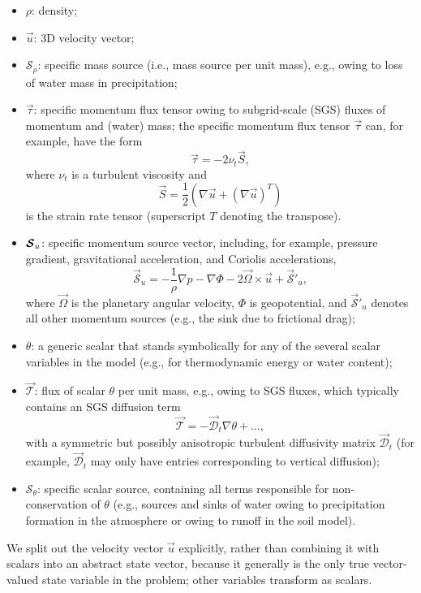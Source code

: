 \documentclass{report}
\begin{document}
\begin{itemize}
    \item $\rho$: density;
    \item $\vec{u}$: 3D velocity vector;
    \item $\mathcal{S}_\rho$: specific mass source (i.e., mass source per unit mass), e.g., owing to loss of water mass in precipitation;
    \item $\vec{\tau}$: specific momentum flux tensor owing to subgrid-scale (SGS) fluxes of momentum and (water) mass; the specific momentum flux tensor $\vec{\tau}$ can, for example, have the form
    \begin{equation}\label{e:SGS_stress}
        \vec{\tau} = -2 \nu_t \vec{S},
    \end{equation}
    where $\nu_t$ is a turbulent viscosity and
    \begin{equation}\label{e:strain_rate}
        \vec{S} = \frac{1}{2} \left( \nabla \vec{u} + (\nabla\vec{u})^T \right)
    \end{equation}
    is the strain rate tensor (superscript $T$ denoting the transpose).
    \item $\boldsymbol{{\mathcal{S}}}_u$: specific momentum source vector, including, for example, pressure gradient, gravitational acceleration, and Coriolis accelerations, 
    \begin{equation}\label{e:momentum_source}
    \vec{\mathcal{S}}_u = -\frac{1}{\rho} \nabla p - \nabla\Phi - 2\vec{\Omega} \times \vec{u} + \vec{\mathcal{S}}'_u,
    \end{equation}
    where $\vec{\Omega}$ is the planetary angular velocity, $\Phi$ is geopotential, and $\vec{\mathcal{S}}'_u$ denotes all other momentum sources (e.g., the sink due to frictional drag);
    \item $\theta$: a generic scalar that stands symbolically for any of the several scalar variables in the model (e.g., for thermodynamic energy or water content);
    \item $\vec{\mathcal{T}}$: flux of scalar $\theta$ per unit mass, e.g., owing to SGS fluxes, which typically contains an SGS diffusion term
    \[
    \vec{\mathcal{T}} = - \vec{\mathcal{D}}_t \nabla \theta + \dots,
    \]
    with a symmetric but possibly anisotropic turbulent diffusivity matrix $\vec{\mathcal{D}}_t$ (for example, $\vec{\mathcal{D}}_t$ may only have entries corresponding to vertical diffusion);
    \item $\mathcal{S}_\theta$: specific scalar source, containing all terms responsible for non-conservation of $\theta$ (e.g., sources and sinks of water owing to precipitation formation in the atmosphere or owing to runoff in the soil model).
 \end{itemize}
 We split out the velocity vector $\vec{u}$ explicitly, rather than combining it with scalars into an abstract state vector, because it generally is the only true vector-valued state variable in the problem; other variables transform as scalars. 
\end{document}
